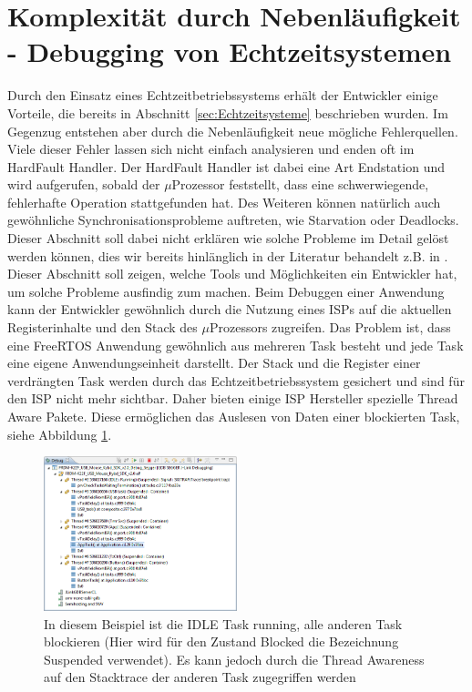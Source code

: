 \section{Komplexität durch Nebenläufigkeit - Debugging von Echtzeitsystemen} 
\label{sec:Debugging von Echtzeitsystemen}
Durch den Einsatz eines Echtzeitbetriebssystems erhält der Entwickler einige Vorteile, die bereits in Abschnitt \ref{sec:Echtzeitsysteme} beschrieben wurden. Im Gegenzug entstehen aber durch die Nebenläufigkeit neue mögliche Fehlerquellen. Viele dieser Fehler lassen sich nicht einfach analysieren und enden oft im HardFault Handler. Der HardFault Handler ist dabei eine Art Endstation und wird aufgerufen, sobald der $\mu$Prozessor feststellt, dass eine schwerwiegende, fehlerhafte Operation stattgefunden hat. Des Weiteren können na\-tür\-lich auch gewöhnliche Synchronisationsprobleme auftreten, wie Starvation oder Deadlocks. Dieser Abschnitt soll dabei nicht erklären wie solche Probleme im Detail gelöst werden können, dies wir bereits hinlänglich in der Literatur behandelt z.B. in \cite{9783827373427} \cite{9783864902222}. Dieser Abschnitt soll zeigen, welche Tools und Möglichkeiten ein Entwickler hat, um solche Probleme ausfindig zum machen. Beim Debuggen einer Anwendung kann der Entwickler gewöhnlich durch die Nutzung eines ISPs auf die aktuellen Registerinhalte und den Stack des $\mu$Prozessors zugreifen. 
Das Problem ist, dass eine FreeRTOS Anwendung gewöhnlich aus mehreren Task besteht und jede Task eine eigene Anwendungseinheit darstellt. Der Stack und die Register einer verdrängten Task werden durch das Echtzeitbetriebssystem gesichert und sind für den ISP nicht mehr sichtbar. Daher bieten einige ISP Hersteller spezielle Thread Aware Pakete. Diese ermöglichen das Auslesen von Daten einer blockierten Task, siehe Abbildung \ref{fig:ThreadAware}.
\begin{figure}[hbt]
	\centering
		\includegraphics[width=0.5\textwidth]{Pictures/Segger/freertosThreadAwareness}
	\caption{In diesem Beispiel ist die IDLE Task running, alle anderen Task blockieren (Hier wird für den Zustand Blocked die Bezeichnung Suspended verwendet). Es kann jedoch durch die Thread Awareness auf den Stacktrace der anderen Task zugegriffen werden }
	\label{fig:ThreadAware}
\end{figure}
